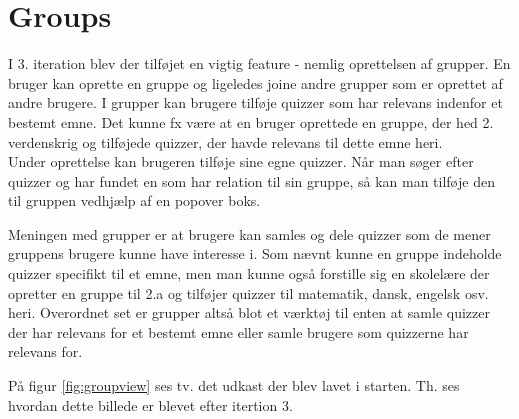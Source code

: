 \section{Groups}

I 3. iteration blev der tilføjet en vigtig feature - nemlig oprettelsen af grupper.
En bruger kan oprette en gruppe og ligeledes joine andre grupper som er oprettet af andre brugere. I grupper kan brugere tilføje quizzer som har relevans indenfor et bestemt emne. Det kunne fx være at en bruger oprettede en gruppe, der hed 2. verdenskrig og tilføjede quizzer, der havde relevans til dette emne heri. \\
Under oprettelse kan brugeren tilføje sine egne quizzer. Når man søger efter quizzer og har fundet en som har relation til sin gruppe, så kan man tilføje den til gruppen vedhjælp af en popover boks.

Meningen med grupper er at brugere kan samles og dele quizzer som de mener gruppens brugere kunne have interesse i.  Som nævnt kunne en gruppe indeholde quizzer specifikt til et emne, men man kunne også forstille sig en skolelære der opretter en gruppe til 2.a og tilføjer quizzer til matematik, dansk, engelsk osv. heri. Overordnet set er grupper altså blot et værktøj til enten at samle quizzer der har relevans for et bestemt emne eller samle brugere som quizzerne har relevans for.


På figur \ref{fig:groupview} ses tv. det udkast der blev lavet i starten. Th. ses hvordan dette billede er blevet efter itertion 3.